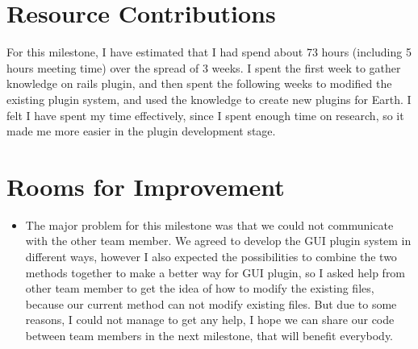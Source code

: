 \section*{Resource Contributions}

For this milestone, I have estimated that I had spend about 73 hours (including 5 hours meeting time) over the spread of 3 weeks. I spent the first week to gather knowledge on rails plugin, and then spent the following weeks to modified the existing plugin system, and used the knowledge to create new plugins for Earth. I felt I have spent my time effectively, since I spent enough time on research, so it made me more easier in the plugin development stage. 

\section*{Rooms for Improvement}

\begin{itemize}
   \item The major problem for this milestone was that we could not communicate with the other team member. We agreed to develop the GUI plugin system in different ways, however I also expected the possibilities to combine the two methods together to make a better way for GUI plugin, so I asked help from other team member to get the idea of how to modify the existing files, because our current method can not modify existing files. But due to some reasons, I could not manage to get any help, I hope we can share our code between team members in the next milestone, that will benefit everybody.
\end{itemize}

